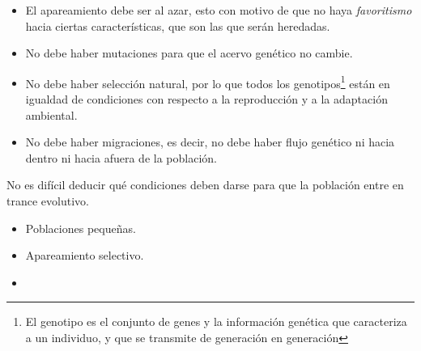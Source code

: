\documentclass[letterpaper]{article}
\begin{document}
{{\begin{itemize}
{                }

                \item {

                    \normalsize{El apareamiento debe ser al azar, esto con motivo de que no haya \textit{favoritismo} hacia ciertas características, que son las que serán heredadas.}
                
                }

                \item {

                    \normalsize{No debe haber mutaciones para que el acervo genético no cambie.}
                
                }

                \item {

                    \normalsize{No debe haber selección natural, por lo que todos los genotipos\footnote{El genotipo es el conjunto de genes y la información genética que caracteriza a un individuo, y que se transmite de generación en generación} están en igualdad de condiciones con respecto a la reproducción y a la adaptación ambiental.}
                
                }

                \item {

                    \normalsize{No debe haber migraciones, es decir, no debe haber flujo genético ni hacia dentro ni hacia afuera de la población.}
                
                }
            \end{itemize}

            \normalsize{No es difícil deducir qué condiciones deben darse para que la población entre en trance evolutivo.}

            \begin{itemize}
                \item {

                    \normalsize{Poblaciones pequeñas.}
                
                }

                \item {

                    \normalsize{Apareamiento selectivo.}
                
                }

                \item {

}
\end{itemize}}}
\end{document}
